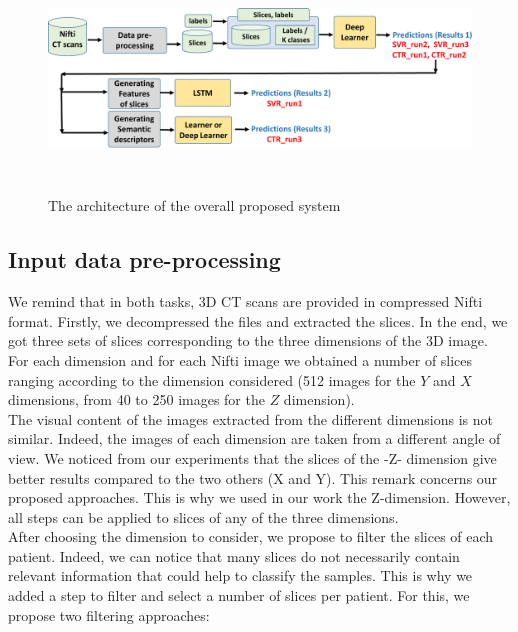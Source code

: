 \documentclass{llncs}
\begin{document}
\begin{figure}
\includegraphics[width=\textwidth,height=6cm]{system.pdf}
\caption{The architecture of the overall proposed system} 
\label{fig:system}
\end{figure}


\subsection{Input data pre-processing}
\label{preprocess}
We remind that in both tasks, 3D CT scans are provided in compressed Nifti format. Firstly, we decompressed the files and extracted the slices. In the end, we got three sets of slices corresponding to the three dimensions of the 3D image. For each dimension and for each Nifti image we obtained a number of slices ranging according to the dimension considered (512 images for the $Y$ and $X$ dimensions, from 40 to 250 images for the $Z$ dimension).\\

The visual content of the images extracted from the different dimensions is not similar. Indeed, the images of each dimension are taken from a different angle of view. We noticed from our experiments that the slices of the -Z- dimension give better results compared to the two others (X and Y). This remark concerns our proposed approaches. This is why we used in our work the Z-dimension. However, all steps can be applied to slices of any of the three dimensions.\\

After choosing the dimension to consider, we propose to filter the slices of each patient. Indeed, we can notice that many slices do not necessarily contain relevant information that could help to classify the samples. This is why we added a step to filter and select a number of slices per patient. For this, we propose two filtering approaches:\\
\end{document}
